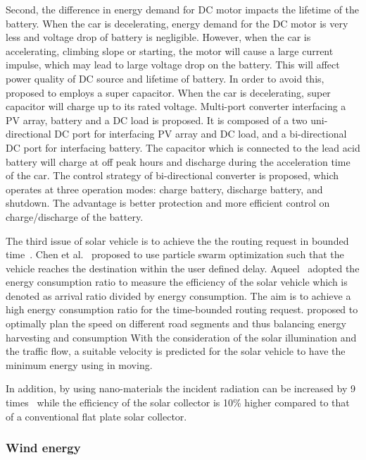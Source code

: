Second, the difference in energy demand for DC motor impacts the lifetime of the battery. When the car is decelerating, energy demand for the DC motor is very less and voltage drop of battery is negligible. However, when the car is accelerating, climbing slope or starting, the motor will cause a large current impulse, which may lead to large voltage drop on the battery. This will affect power quality of DC source and lifetime of battery. In order to avoid this,~\cite{JX_2,JX_26,JX_67} proposed to employs a super capacitor. When the car is decelerating, super capacitor will charge up to its rated voltage. Multi-port converter interfacing a PV array, battery and a DC load is proposed. It is composed of a two uni-directional DC port for interfacing PV array and DC load, and a bi-directional DC port for interfacing battery. The capacitor which is connected to the lead acid battery will charge at off peak hours and discharge during the acceleration time of the car. The control strategy of bi-directional converter is proposed, which operates at three operation modes: charge battery, discharge battery, and shutdown. The advantage is better protection and more efficient control on charge/discharge of the battery.

The third issue of solar vehicle is to achieve the the routing request in bounded time~\cite{JX_4,JX_14,JX_17,JX_46}. Chen et al.~\cite{JX_14} proposed to use particle swarm optimization such that the vehicle reaches the destination within the user defined delay. Aqueel~\cite{JX_4} adopted the energy consumption ratio to measure the efficiency of the solar vehicle which is denoted as arrival ratio divided by energy consumption. The aim is to achieve a high energy consumption ratio for the time-bounded routing request. \cite{JX_17} proposed to optimally plan the speed on different road segments and thus balancing energy harvesting and consumption With the consideration of the solar illumination and the traffic flow, a suitable velocity is predicted for the solar vehicle to have the minimum energy using in moving.

In addition, by using nano-materials the incident radiation can be increased by 9 times~\cite{JX_1} while the efficiency of the solar collector is 10\% higher compared to that of a conventional flat plate solar collector.

\subsubsection{Wind energy}

